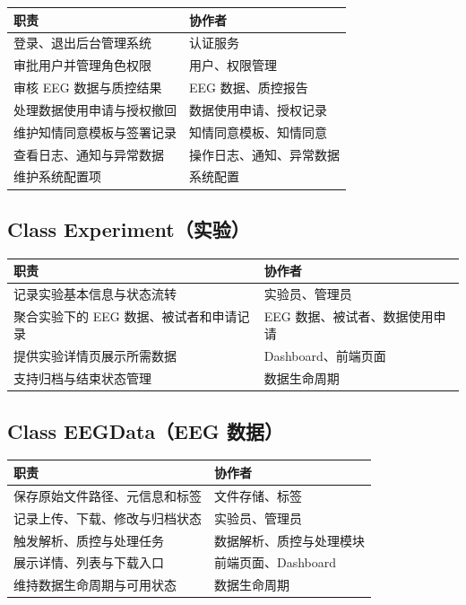 \begin{longtable}{|p{84mm}|p{54mm}|}
\hline
\textbf{职责} & \textbf{协作者} \\
\hline
登录、退出后台管理系统 & 认证服务 \\
\hline
审批用户并管理角色权限 & 用户、权限管理 \\
\hline
审核 EEG 数据与质控结果 & EEG 数据、质控报告 \\
\hline
处理数据使用申请与授权撤回 & 数据使用申请、授权记录 \\
\hline
维护知情同意模板与签署记录 & 知情同意模板、知情同意 \\
\hline
查看日志、通知与异常数据 & 操作日志、通知、异常数据 \\
\hline
维护系统配置项 & 系统配置 \\
\hline
\end{longtable}

\subsection{Class Experiment（实验）}

\begin{longtable}{|p{84mm}|p{54mm}|}
\hline
\textbf{职责} & \textbf{协作者} \\
\hline
记录实验基本信息与状态流转 & 实验员、管理员 \\
\hline
聚合实验下的 EEG 数据、被试者和申请记录 & EEG 数据、被试者、数据使用申请 \\
\hline
提供实验详情页展示所需数据 & Dashboard、前端页面 \\
\hline
支持归档与结束状态管理 & 数据生命周期 \\
\hline
\end{longtable}

\subsection{Class EEGData（EEG 数据）}

\begin{longtable}{|p{84mm}|p{54mm}|}
\hline
\textbf{职责} & \textbf{协作者} \\
\hline
保存原始文件路径、元信息和标签 & 文件存储、标签 \\
\hline
记录上传、下载、修改与归档状态 & 实验员、管理员 \\
\hline
触发解析、质控与处理任务 & 数据解析、质控与处理模块 \\
\hline
展示详情、列表与下载入口 & 前端页面、Dashboard \\
\hline
维持数据生命周期与可用状态 & 数据生命周期 \\
\hline
\end{longtable}


